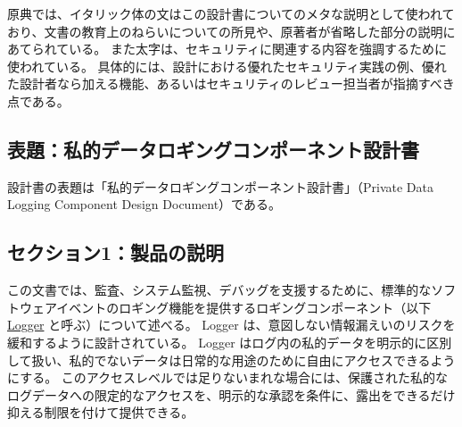 \documentclass[uplatex]{jsarticle}
\begin{document}
原典では、イタリック体の文はこの設計書についてのメタな説明として使われており、文書の教育上のねらいについての所見や、原著者が省略した部分の説明にあてられている。
また太字は、セキュリティに関連する内容を強調するために使われている。
具体的には、設計における優れたセキュリティ実践の例、優れた設計者なら加える機能、あるいはセキュリティのレビュー担当者が指摘すべき点である。

\subsection{表題：私的データロギングコンポーネント設計書}

設計書の表題は「私的データロギングコンポーネント設計書」（Private Data Logging Component Design Document）である。


\subsection{セクション1：製品の説明}

この文書では、監査、システム監視、デバッグを支援するために、標準的なソフトウェアイベントのロギング機能を提供するロギングコンポーネント（以下 \underline{Logger} と呼ぶ）について述べる。
Logger は、意図しない情報漏えいのリスクを緩和するように設計されている。
Logger はログ内の私的データを明示的に区別して扱い、私的でないデータは日常的な用途のために自由にアクセスできるようにする。
このアクセスレベルでは足りないまれな場合には、保護された私的なログデータへの限定的なアクセスを、明示的な承認を条件に、露出をできるだけ抑える制限を付けて提供できる。
\end{document}
